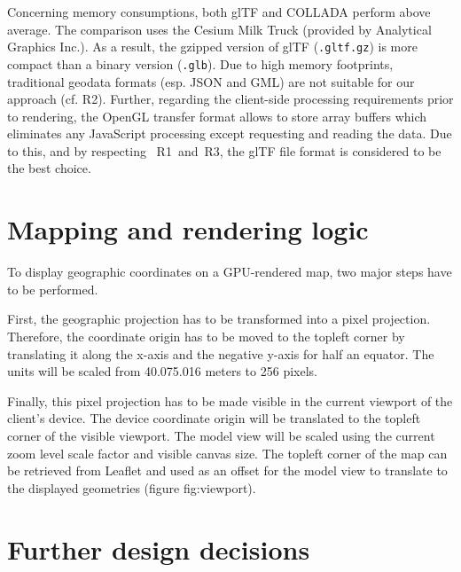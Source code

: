       Concerning memory consumptions, both glTF and COLLADA perform above average. The
      comparison uses the Cesium Milk Truck (provided by Analytical Graphics Inc.). As
      a result, the gzipped version of glTF (\texttt{.gltf.gz}) is more compact than a
      binary version (\texttt{.glb}). Due to high memory footprints, traditional
      geodata formats (esp. JSON and GML) are not suitable for our approach (cf. R2). Further,
      regarding the client-side processing requirements prior to rendering, the OpenGL
      transfer format allows to store array buffers which eliminates any JavaScript
      processing except requesting and reading the data. Due to this, and by respecting~
      R1~and~R3, the glTF file format is considered to be the best choice.

  \section{Mapping and rendering logic}
    \label{sec:conct:rendr}
    To display geographic coordinates on a GPU-rendered map, two major steps have to be performed.\par
    First, the geographic projection has to be transformed into a pixel projection. Therefore, the coordinate origin has to be moved to the topleft corner by translating it along the x-axis and the negative y-axis for half an equator. The units will be scaled from 40.075.016 meters to 256 pixels.


    Finally, this pixel projection has to be made visible in the current viewport of the client's device. The device coordinate origin will be translated to the topleft corner of the visible viewport. The model view will be scaled using the current zoom level scale factor and visible canvas size.  The topleft corner of the map can be retrieved from Leaflet and used as an offset for the model view to translate to the displayed geometries (figure {fig:viewport}).\par

  \section{Further design decisions}
    \label{sec:conct:desgn}
